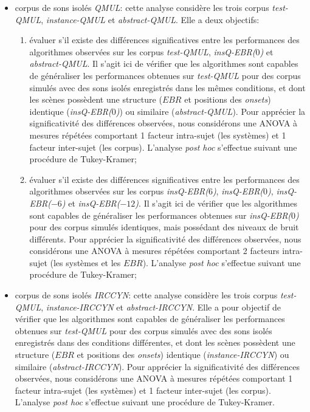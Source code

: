 \begin{itemize}

\item corpus de sons isolés \emph{QMUL}: cette analyse considère les trois corpus \emph{test-QMUL}, \emph{instance-QMUL} et \emph{abstract-QMUL}. Elle a deux objectifs:

\begin{enumerate}
\item évaluer s'il existe des différences significatives entre les performances des algorithmes observées sur les corpus \emph{test-QMUL}, \emph{insQ-EBR($0$)} et \emph{abstract-QMUL}. Il s'agit ici de vérifier que les algorithmes sont capables de généraliser les performances obtenues sur \emph{test-QMUL} pour des corpus simulés avec des sons isolés enregistrés dans les mêmes conditions, et dont les scènes possèdent une structure ($EBR$ et positions des \emph{onsets}) identique (\emph{insQ-EBR($0$)}) ou similaire (\emph{abstract-QMUL}). Pour apprécier la significativité des différences observées, nous considérons une ANOVA à mesures répétées comportant 1 facteur intra-sujet (les systèmes) et 1 facteur inter-sujet (les corpus). L'analyse \emph{post hoc} s'effectue suivant une procédure de Tukey-Kramer;

\item évaluer s'il existe des différences significatives entre les performances des algorithmes observées sur les corpus \emph{insQ-EBR($6$)}, \emph{insQ-EBR($0$)}, \emph{insQ-EBR($-6$)} et \emph{insQ-EBR($-12$)}. Il s'agit ici de vérifier que les algorithmes sont capables de généraliser les performances obtenues sur \emph{insQ-EBR($0$)} pour des corpus simulés identiques, mais possédant des niveaux de bruit différents. Pour apprécier la significativité des différences observées, nous considérons une ANOVA à mesures répétées comportant 2 facteurs intra-sujet (les systèmes et les $EBR$). L'analyse \emph{post hoc} s'effectue suivant une procédure de Tukey-Kramer;

\end{enumerate}

\item corpus de sons isolés \emph{IRCCYN}: cette analyse considère les trois corpus \emph{test-QMUL}, \emph{instance-IRCCYN} et \emph{abstract-IRCCYN}. Elle a pour objectif de vérifier que les algorithmes sont capables de généraliser les performances obtenues sur \emph{test-QMUL} pour des corpus simulés avec des sons isolés enregistrés dans des conditions différentes, et dont les scènes possèdent une structure ($EBR$ et positions des \emph{onsets}) identique (\emph{instance-IRCCYN}) ou similaire (\emph{abstract-IRCCYN}). Pour apprécier la significativité des différences observées, nous considérons une ANOVA à mesures répétées comportant 1 facteur intra-sujet (les systèmes) et 1 facteur inter-sujet (les corpus). L'analyse \emph{post hoc} s'effectue suivant une procédure de Tukey-Kramer.

\end{itemize}

